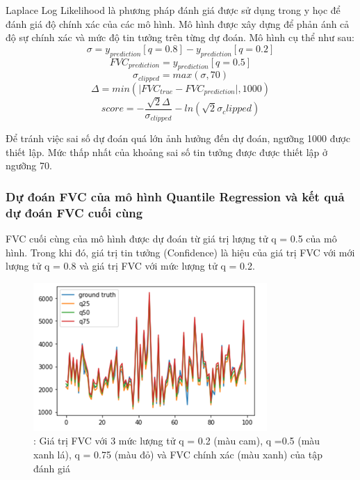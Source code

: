 Laplace Log Likelihood là phương pháp đánh giá được sử dụng trong y học để đánh giá độ chính xác của các mô hình. Mô hình được xây dựng để phản ánh cả độ sự chính xác và mức độ tin tưởng trên từng dự đoán. Mô hình cụ thể như sau:
$$\sigma = y_{prediction}[q=0.8] - y_{prediction}[q=0.2]$$
$$FVC_{prediction} = y_{prediction}[q=0.5]$$
$$\sigma_{clipped} = max(\sigma,70)$$
$$\Delta = min(\vert FVC_{true} - FVC_{prediction} \vert, 1000)$$
$$score = -\dfrac{\sqrt{2}\Delta}{\sigma_{clipped}} - ln(\sqrt{2}\sigma_clipped)$$
\par Để tránh việc sai số dự đoán quá lớn ảnh hưởng đến dự đoán, ngưỡng 1000 được thiết lập. Mức thấp nhất của khoảng sai số tin tưởng được được thiết lập ở ngưỡng 70.
\subsubsection{Dự đoán FVC của mô hình Quantile Regression và kết quả dự đoán FVC cuối cùng}
FVC cuối cùng của mô hình được dự đoán từ giá trị lượng tử q = 0.5 của mô hình. Trong khi đó, giá trị tin tưởng (Confidence) là hiệu của giá trị FVC với mới lượng tử q = 0.8 và giá trị FVC với mức lượng tử q = 0.2.
\begin{figure}[ht!]
\centerline{\includegraphics[scale=0.7]{images/train3.png}}
\caption{: Giá trị FVC với 3 mức lượng tử q = 0.2 (màu cam), q =0.5 (màu xanh lá), q = 0.75 (màu đỏ) và FVC chính xác (màu xanh) của tập đánh giá}
\label{fig:train3}
\end{figure} 